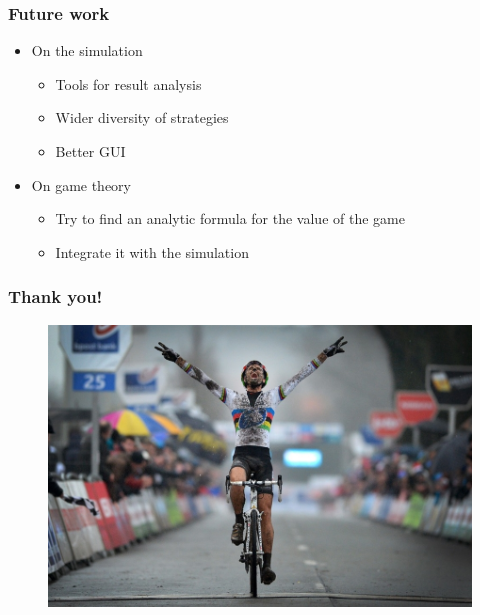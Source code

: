 \documentclass{beamer}
\begin{document}
\begin{frame}
\frametitle{Future work}
  \begin{itemize}
  \item{On the simulation}
    \begin{itemize}
    \item Tools for result analysis
    \item Wider diversity of strategies
    \item Better GUI
    \end{itemize}
    
    \pause
    
    \vspace{0.3cm}

  \item{On game theory}
    \begin{itemize}
    \item Try to find an analytic formula for the value of the game
    \item Integrate it with the simulation
    \end{itemize}
  \end{itemize}
\end{frame}


\begin{frame}
\frametitle{Thank you!}
\centering
\begin{figure}[ht!]
  \includegraphics[scale=0.37]{final.jpg}
\end{figure} 
\end{frame}

\end{document}
